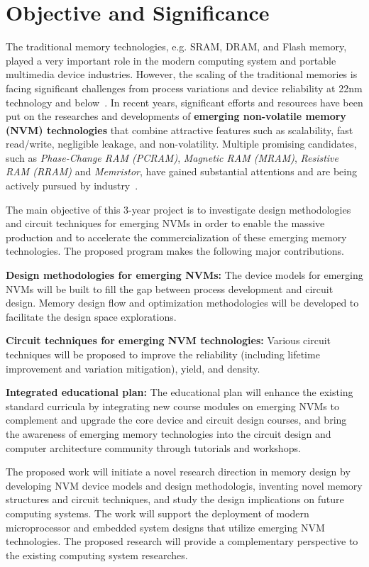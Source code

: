 \section{Objective and Significance}

The traditional memory technologies, e.g. SRAM, DRAM, and Flash memory, played a very important role in the modern computing system and portable multimedia device industries. However, the scaling of the traditional memories is facing significant challenges from process variations and device reliability at 22nm technology and below~\cite{ITRS07,Kinam07}.
In recent years, significant efforts and resources have been put on the researches and developments of \textbf{emerging non-volatile memory (NVM) technologies} that combine attractive features such as scalability, fast read/write, negligible leakage, and non-volatility. Multiple promising candidates, such as \emph{Phase-Change RAM (PCRAM)}, \emph{Magnetic RAM (MRAM)}, \emph{Resistive RAM (RRAM)} and \emph{Memristor}, have gained substantial attentions and are being actively pursued by industry~\cite{ITRS07,burr:scm08}.

The main objective of this 3-year project is to investigate design methodologies and circuit techniques for emerging NVMs in order to enable the massive production and to accelerate the commercialization of these emerging memory technologies. The proposed program makes the following major contributions.

\vspace{5pt}
\squishlist
\item {\textbf{Design methodologies for emerging NVMs:} The device models for emerging NVMs will be built to fill the gap between process development and circuit design. Memory design flow and optimization methodologies will be developed to facilitate the design space explorations.}
\item {\textbf{Circuit techniques for emerging NVM technologies:} Various circuit techniques will be proposed to improve the reliability (including lifetime improvement and variation mitigation), yield, and density.}
\item {\textbf{Integrated educational plan:} The educational plan will enhance the existing standard curricula by integrating new course modules on emerging NVMs to complement and upgrade the core device and circuit design courses, and bring the awareness of emerging memory technologies into the circuit design and computer architecture community through tutorials and workshops.}
\squishend
\vspace{5pt}

The proposed work will initiate a novel research direction in memory design by developing NVM device models and design methodologis, inventing novel memory structures and circuit techniques, and study the design implications on future computing systems. The work will support the deployment of modern microprocessor and embedded system designs that utilize emerging NVM technologies. The proposed research will provide a complementary perspective to the existing computing system researches.

